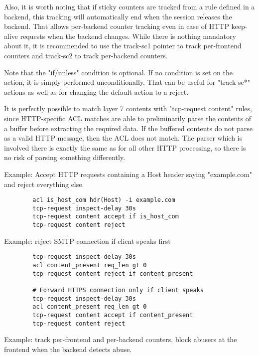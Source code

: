   Also, it is worth noting that if sticky counters are tracked from a rule
  defined in a backend, this tracking will automatically end when the session
  releases the backend. That allows per-backend counter tracking even in case
  of HTTP keep-alive requests when the backend changes. While there is nothing
  mandatory about it, it is recommended to use the track-sc1 pointer to track
  per-frontend counters and track-sc2 to track per-backend counters.

  Note that the "if/unless" condition is optional. If no condition is set on
  the action, it is simply performed unconditionally. That can be useful for
  "track-sc*" actions as well as for changing the default action to a reject.

  It is perfectly possible to match layer 7 contents with "tcp-request content"
  rules, since HTTP-specific ACL matches are able to preliminarily parse the
  contents of a buffer before extracting the required data. If the buffered
  contents do not parse as a valid HTTP message, then the ACL does not match.
  The parser which is involved there is exactly the same as for all other HTTP
  processing, so there is no risk of parsing something differently.

  Example: Accept HTTP requests containing a Host header saying "example.com" and reject everything else.
  \begin{verbatim}
        acl is_host_com hdr(Host) -i example.com
        tcp-request inspect-delay 30s
        tcp-request content accept if is_host_com
        tcp-request content reject
  \end{verbatim}

  Example: reject SMTP connection if client speaks first
  \begin{verbatim}
        tcp-request inspect-delay 30s
        acl content_present req_len gt 0
        tcp-request content reject if content_present

        # Forward HTTPS connection only if client speaks
        tcp-request inspect-delay 30s
        acl content_present req_len gt 0
        tcp-request content accept if content_present
        tcp-request content reject
  \end{verbatim}

  Example: track per-frontend and per-backend counters, block abusers at the
           frontend when the backend detects abuse.

